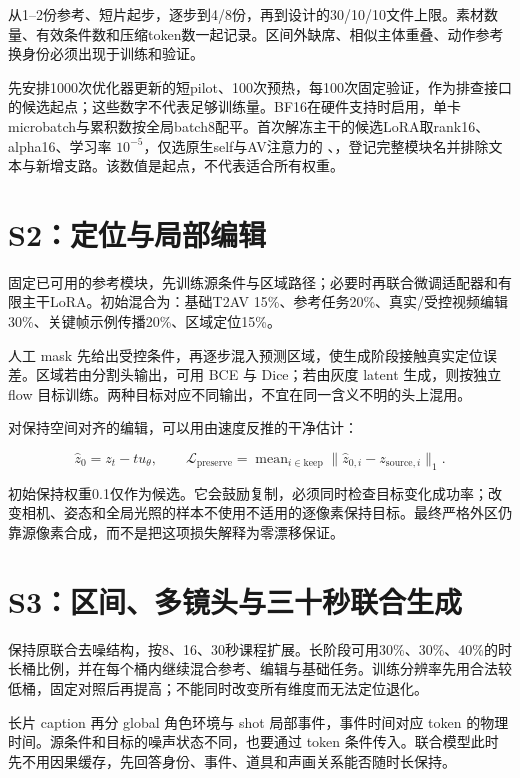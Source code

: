 从1--2份参考、短片起步，逐步到4/8份，再到设计的30/10/10文件上限。素材数量、有效条件数和压缩token数一起记录。区间外缺席、相似主体重叠、动作参考换身份必须出现于训练和验证。

先安排1000次优化器更新的短pilot、100次预热，每100次固定验证，作为排查接口的候选起点；这些数字不代表足够训练量。BF16在硬件支持时启用，单卡microbatch与累积数按全局batch8配平。首次解冻主干的候选LoRA取rank16、alpha16、学习率 \(10^{-5}\)，仅选原生self与AV注意力的 、，登记完整模块名并排除文本与新增支路。该数值是起点，不代表适合所有权重。

\section{S2：定位与局部编辑}\label{seedance-m20-s2ux5b9aux4f4dux4e0eux5c40ux90e8ux7f16ux8f91}

固定已可用的参考模块，先训练源条件与区域路径；必要时再联合微调适配器和有限主干LoRA。初始混合为：基础T2AV 15\%、参考任务20\%、真实/受控视频编辑30\%、关键帧示例传播20\%、区域定位15\%。

人工 mask 先给出受控条件，再逐步混入预测区域，使生成阶段接触真实定位误差。区域若由分割头输出，可用 BCE 与 Dice；若由灰度 latent 生成，则按独立 flow 目标训练。两种目标对应不同输出，不宜在同一含义不明的头上混用。

对保持空间对齐的编辑，可以用由速度反推的干净估计：

\[
\hat z_0=z_t-tu_\theta,
\qquad
\mathcal{L}_{\mathrm{preserve}}=
\operatorname{mean}_{i\in\mathrm{keep}}
\lVert\hat z_{0,i}-z_{\mathrm{source},i}\rVert_1.
\]

初始保持权重0.1仅作为候选。它会鼓励复制，必须同时检查目标变化成功率；改变相机、姿态和全局光照的样本不使用不适用的逐像素保持目标。最终严格外区仍靠源像素合成，而不是把这项损失解释为零漂移保证。

\section{S3：区间、多镜头与三十秒联合生成}\label{seedance-m20-s3ux533aux95f4ux591aux955cux5934ux4e0eux4e09ux5341ux79d2ux8054ux5408ux751fux6210}

保持原联合去噪结构，按8、16、30秒课程扩展。长阶段可用30\%、30\%、40\%的时长桶比例，并在每个桶内继续混合参考、编辑与基础任务。训练分辨率先用合法较低桶，固定对照后再提高；不能同时改变所有维度而无法定位退化。

长片 caption 再分 global 角色环境与 shot 局部事件，事件时间对应 token 的物理时间。源条件和目标的噪声状态不同，也要通过 token 条件传入。联合模型此时先不用因果缓存，先回答身份、事件、道具和声画关系能否随时长保持。

